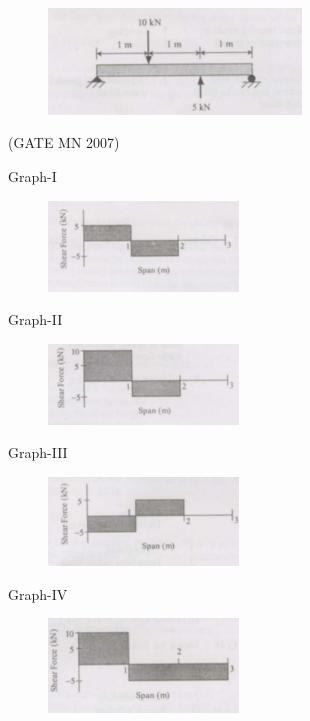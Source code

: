 \documentclass[journal]{IEEEtran}
\begin{document}
\begin{enumerate}
\begin{figure}[H]
    \centering
\includegraphics[width=0.6\textwidth]{Screenshot_2025_0812_143315.png}
\caption{}
    \label{fig:Q43}
\end{figure}
\hfill (GATE MN 2007)
\begin{multicols}{2}
	Graph-I \\
	\begin{figure}[H]
\includegraphics[width=0.45\textwidth]{Screenshot_2025_0812_143545.png} \\
\caption{}
\label{fig:Q43option1}
 \end{figure}
Graph-II \\
\begin{figure}[H]
\includegraphics[width=0.45\textwidth]{Screenshot_2025_0812_143610.png} \\
\caption{}
  \label{fig:Q43option2}
  \end{figure}
Graph-III \\
\begin{figure}[H]
\includegraphics[width=0.45\textwidth]{Screenshot_2025_0812_144908.png} \\
\caption{}
  \label{fig:Q43option3}
  \end{figure}
Graph-IV \\
\begin{figure}[H]
\includegraphics[width=0.45\textwidth]{Screenshot_2025_0812_143638.png} \\
\caption{}
\label{fig:Q43option4}
 \end{figure}


\end{multicols}
\end{enumerate}
\end{document}
